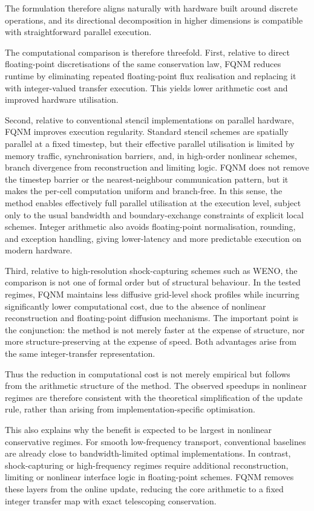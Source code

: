 \documentclass[sn-basic]{sn-jnl}
\theoremstyle{plain}
\theoremstyle{remark}
\begin{document}
The formulation therefore aligns naturally with hardware built around discrete operations, and its directional decomposition in higher dimensions is compatible with straightforward parallel execution.

\noindent
The computational comparison is therefore threefold. First, relative to direct floating-point discretisations of the same conservation law, FQNM reduces runtime by eliminating repeated floating-point flux realisation and replacing it with integer-valued transfer execution. This yields lower arithmetic cost and improved hardware utilisation.
  
Second, relative to conventional stencil implementations on parallel hardware, FQNM improves execution regularity. Standard stencil schemes are spatially parallel at a fixed timestep, but their effective parallel utilisation is limited by memory traffic, synchronisation barriers, and, in high-order nonlinear schemes, branch divergence from reconstruction and limiting logic. FQNM does not remove the timestep barrier or the nearest-neighbour communication pattern, but it makes the per-cell computation uniform and branch-free. In this sense, the method enables effectively full parallel utilisation at the execution level, subject only to the usual bandwidth and boundary-exchange constraints of explicit local schemes. Integer arithmetic also avoids floating-point normalisation, rounding, and exception handling, giving lower-latency and more predictable execution on modern hardware.

Third, relative to high-resolution shock-capturing schemes such as WENO, the comparison is not one of formal order but of structural behaviour. In the tested regimes, FQNM maintains less diffusive grid-level shock profiles while incurring significantly lower computational cost, due to the absence of nonlinear reconstruction and floating-point diffusion mechanisms. The important point is the conjunction: the method is not merely faster at the expense of structure, nor more structure-preserving at the expense of speed. Both advantages arise from the same integer-transfer representation.

Thus the reduction in computational cost is not merely empirical but follows from the arithmetic structure of the method. The observed speedups in nonlinear regimes are therefore consistent with the theoretical simplification of the update rule, rather than arising from implementation-specific optimisation.

This also explains why the benefit is expected to be largest in nonlinear conservative regimes. For smooth low-frequency transport, conventional baselines are already close to bandwidth-limited optimal implementations. In contrast, shock-capturing or high-frequency regimes require additional reconstruction, limiting or nonlinear interface logic in floating-point schemes. FQNM removes these layers from the online update, reducing the core arithmetic to a fixed integer transfer map with exact telescoping conservation.
\end{document}
